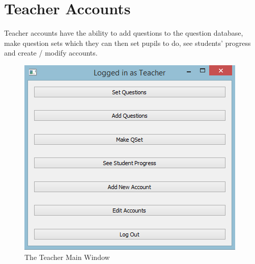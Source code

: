 \documentclass{report}
\begin{document}
\chapter{Teacher Accounts}
Teacher accounts have the ability to add questions to the question database, make question sets which they can then set pupils to do, see students' progress and create / modify accounts. \\
\begin{figure}[h]
\centering
\includegraphics{teachermain}
\caption{The Teacher Main Window}
\label{fig:teachermain}
\end{figure}
\end{document}
